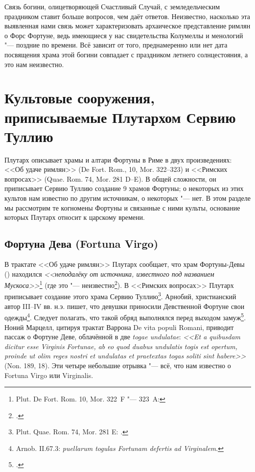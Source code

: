 
Связь богини, олицетворяющей Счастливый Случай, с земледельческим праздником ставит больше вопросов, чем даёт ответов. Неизвестно, насколько эта выявленная нами связь может характеризовать архаическое представление римлян о Форс Фортуне, ведь имеющиеся у нас свидетельства Колумеллы и менологий "--- поздние по времени. Всё зависит от того, преднамеренно или нет дата посвящения храма этой богини совпадает с праздником летнего солнцестояния, а это нам неизвестно.



\section{Культовые сооружения, приписываемые Плутархом Сервию Туллию}\label{PlutarchiCulti}

Плутарх описывает храмы и алтари Фортуны в Риме в двух произведениях: <<Об удаче римлян>> (De Fort. Rom., 10, Mor. 322--323) и <<Римских вопросах>> (Quae. Rom. 74, Mor. 281 D--E). В общей сложности, он приписывает Сервию Туллию создание 9 храмов Фортуны; о некоторых из этих культов нам известно по другим источникам, о некоторых "--- нет. В этом разделе мы рассмотрим те когномены Фортуны и связанные с ними культы, основание которых Плутарх относит к царскому времени.

\subsection{Фортуна Дева (Fortuna Virgo)}\label{FortunaVirgo}

В трактате <<Об удаче римлян>> Плутарх сообщает, что храм Фортуны-Девы () находился \textit{<<неподалёку от источника, известного под названием Мускоса>>}\footnote{Plut. De Fort. Rom. 10, Mor. 322~F "--- 323~A: } (где это "--- неизвестно\footcite[Pp. 153, 158]{Richardson1992}). В <<Римских вопросах>> Плутарх приписывает создание этого храма Сервию Туллию\footnote{Plut. Quae. Rom. 74, Mor. 281 E: .}. Арнобий, христианский автор III--IV вв. н.э. пишет, что девушки приносили Девственной Фортуне свои одежды\footnote{Arnob. II.67.3: \textit{puellarum togulas Fortunam defertis ad Virginalem}.}. Следует полагать, что такой обряд выполнялся перед выходом замуж\footcite[P. 507]{FortunaBrill2004}. Ноний Марцелл, цитируя трактат Варрона De vita populi Romani, приводит пассаж о Фортуне Деве, облачённой в две \textit{togae undulatae}: \textit{<<Et a quibusdam dicitur esse Virginis Fortunae, ab eo quod duabus undulatis togis est opertum, proinde ut olim reges nostri et undulatas et praetextas togas soliti sint habere>>} (Non. 189, 18). Эти четыре небольшие отрывка "--- всё, что нам известно о Fortuna Virgo или Virginalis.


